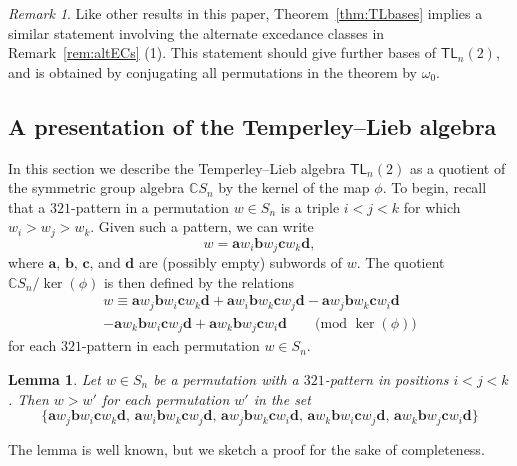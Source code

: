 \documentclass[12pt]{amsart}
\newtheorem{lem}[equation]{Lemma}
\theoremstyle{definition}
\theoremstyle{remark}
\newtheorem{rem}[equation]{Remark}
\numberwithin{equation}{section}
\newcommand{\CC}{\mathbb{C}}
\newcommand{\TL}{\mathsf{TL}}
\begin{document}
\begin{rem}
Like other results in this paper, Theorem~\ref{thm:TLbases} implies a similar statement involving the alternate excedance classes in Remark~\ref{rem:altECs} (1).  This statement should give further bases of $\TL_{n}(2)$, and is obtained by conjugating all permutations in the theorem by $\omega_0$.
\end{rem}

\subsection{A presentation of the Temperley--Lieb algebra}
\label{sec:TLpres}

In this section we describe the Temperley--Lieb algebra $\TL_{n}(2)$ as a quotient of the symmetric group algebra $\CC S_{n}$ by the kernel of the map $\phi$.  
To begin, recall that a $321$-pattern in a permutation $w \in S_{n}$ is a triple $i < j < k$ for which $w_{i} > w_{j} > w_{k}$.  Given such a pattern, we can write
\[
w = \mathbf{a}w_{i}\mathbf{b}w_{j}\mathbf{c}w_{k}\mathbf{d},
\]
where $\mathbf{a}$, $\mathbf{b}$, $\mathbf{c}$, and $\mathbf{d}$ are (possibly empty) subwords of $w$.  The quotient $\CC S_{n} / \ker(\phi)$ is then defined by the relations
\begin{multline}
\label{eq:321relation}
w \equiv \mathbf{a}w_{j}\mathbf{b}w_{i}\mathbf{c}w_{k}\mathbf{d} + \mathbf{a}w_{i}\mathbf{b}w_{k}\mathbf{c}w_{j}\mathbf{d} - \mathbf{a}w_{j}\mathbf{b}w_{k}\mathbf{c}w_{i}\mathbf{d} \\
- \mathbf{a}w_{k}\mathbf{b}w_{i}\mathbf{c}w_{j}\mathbf{d} + \mathbf{a}w_{k}\mathbf{b}w_{j}\mathbf{c}w_{i}\mathbf{d}  \qquad \text{(mod $\ker(\phi)$)}
\end{multline}
for each $321$-pattern in each permutation $w \in S_{n}$.

\begin{lem}
\label{lem:321reducebruhat}
Let $w \in S_{n}$ be a permutation with a $321$-pattern in positions $i < j < k$.  Then $w > w'$ for each permutation $w'$ in the set
\[
\{
\mathbf{a}w_{j}\mathbf{b}w_{i}\mathbf{c}w_{k}\mathbf{d},  \,
\mathbf{a}w_{i}\mathbf{b}w_{k}\mathbf{c}w_{j}\mathbf{d}, \,
\mathbf{a}w_{j}\mathbf{b}w_{k}\mathbf{c}w_{i}\mathbf{d}, \,
\mathbf{a}w_{k}\mathbf{b}w_{i}\mathbf{c}w_{j}\mathbf{d}, \,
\mathbf{a}w_{k}\mathbf{b}w_{j}\mathbf{c}w_{i}\mathbf{d}
\}
\]
\end{lem}

The lemma is well known, but we sketch a proof for the sake of completeness.
\end{document}
